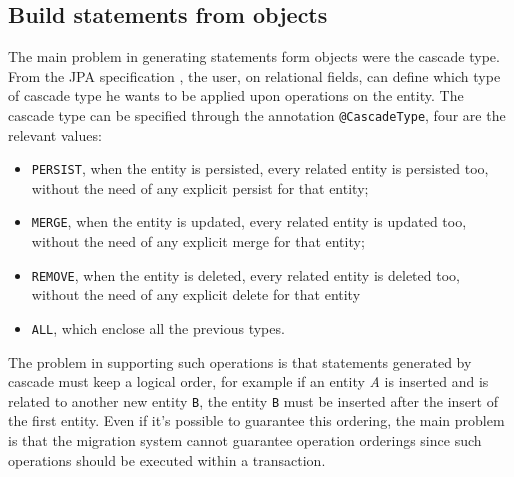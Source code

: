 \subsection{Build statements from objects}
The main problem in generating statements form objects were the cascade type. From the JPA specification \cite{book:projpa2}, the user, on relational fields, can define which type of cascade type he wants to be applied upon operations on the entity. The cascade type can be specified through the annotation \texttt{@CascadeType}, four are the relevant values:
\begin{itemize}
\item \texttt{PERSIST}, when the entity is persisted, every related entity is persisted too, without the need of any explicit persist for that entity;
\item \texttt{MERGE}, when the entity is updated, every related entity is updated too, without the need of any explicit merge for that entity;
\item \texttt{REMOVE}, when the entity is deleted, every related entity is deleted too, without the need of any explicit delete for that entity
\item \texttt{ALL}, which enclose all the previous types.
\end{itemize}

\noindent The problem in supporting such operations is that statements generated by cascade must keep a logical order, for example if an entity \textit{A} is inserted and is related to another new entity \texttt{B}, the entity \texttt{B} must be inserted after the insert of the first entity. Even if it's possible to guarantee this ordering, the main problem is that the migration system cannot guarantee operation orderings since such operations should be executed within a transaction.

